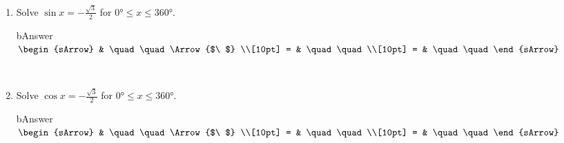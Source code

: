 \clearpage\noindent%
\begin{enumerate}[resume]
  \item Solve $\sin{x}=-\frac{\sqrt{3}}{2}$ for $  0\si{\degree} \leqslant x \leqslant 360\si{\degree}$.
      \begin{envOut}[equal height group=A-Rev-1]{bAnswer}
	       $\begin{sArrow}
	             & \quad\quad       \Arrow{$\ $} \\[10pt]
               = & \quad\quad               \\[10pt]      
			   = & \quad\quad  
	        \end{sArrow}$
      \end{envOut}
	  \begin{shortsolution}  
	     $ \quad \quad \quad \quad$
 	  \end{shortsolution}
	  
  \item Solve $\cos{x}=-\frac{\sqrt{3}}{2}$ for $  0\si{\degree} \leqslant x \leqslant 360\si{\degree}$.
      \begin{envOut}[equal height group=A-Rev-1]{bAnswer}
	       $\begin{sArrow}
	             & \quad\quad       \Arrow{$\ $} \\[10pt]
               = & \quad\quad                    \\[10pt]      
			   = & \quad\quad  
	        \end{sArrow}$
      \end{envOut}
	  \begin{shortsolution}  
	     $ \quad \quad \quad \quad$
 	  \end{shortsolution}
\end{enumerate}

